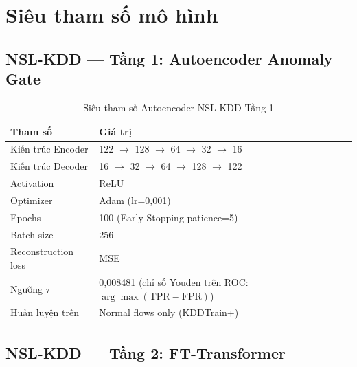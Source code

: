 \documentclass[../DoAn.tex]{subfiles}
\begin{document}
\section{Siêu tham số mô hình}
\label{sec:plb-hyperparams}

\subsection{NSL-KDD --- Tầng 1: Autoencoder Anomaly Gate}

\begin{table}[H]
    \centering
    \caption{Siêu tham số Autoencoder NSL-KDD Tầng 1}
    \label{tab:hyp-ae}
    \begin{tabular}{ll}
        \hline
        \textbf{Tham số} & \textbf{Giá trị} \\
        \hline
        Kiến trúc Encoder & 122 $\to$ 128 $\to$ 64 $\to$ 32 $\to$ 16 \\
        Kiến trúc Decoder & 16 $\to$ 32 $\to$ 64 $\to$ 128 $\to$ 122 \\
        Activation & ReLU \\
        Optimizer & Adam (lr=0,001) \\
        Epochs & 100 (Early Stopping patience=5) \\
        Batch size & 256 \\
        Reconstruction loss & MSE \\
        Ngưỡng $\tau$ & 0,008481 (chỉ số Youden trên ROC: $\arg\max(\text{TPR}-\text{FPR})$) \\
        Huấn luyện trên & Normal flows only (KDDTrain+) \\
        \hline
    \end{tabular}
\end{table}

\subsection{NSL-KDD --- Tầng 2: FT-Transformer}
\end{document}
